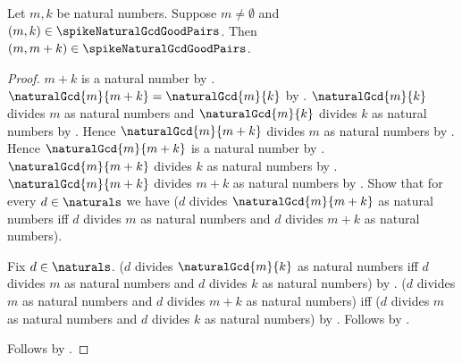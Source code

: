 \begin{theorem}\label{spike15_gcd_good_pair_sum_right}
    Let $m,k$ be natural numbers.
    Suppose $m\neq\emptyset$ and
        $(m,k)\in\spikeNaturalGcdGoodPairs$.
    Then $(m,m+k)\in\spikeNaturalGcdGoodPairs$.
\end{theorem}
\begin{proof}
    $m+k$ is a natural number by .
    $\naturalGcd{m}{m+k}=\naturalGcd{m}{k}$
        by .
    $\naturalGcd{m}{k}$ divides $m$ as natural numbers and
        $\naturalGcd{m}{k}$ divides $k$ as natural numbers
        by .
    Hence $\naturalGcd{m}{m+k}$ divides $m$ as natural numbers
        by \auto.
    Hence $\naturalGcd{m}{m+k}$ is a natural number
        by .
    $\naturalGcd{m}{m+k}$ divides $k$ as natural numbers
        by \auto.
    $\naturalGcd{m}{m+k}$ divides $m+k$ as natural numbers
        by .
    Show that for every $d\in\naturals$ we have
        ($d$ divides $\naturalGcd{m}{m+k}$ as natural numbers iff
         $d$ divides $m$ as natural numbers and
         $d$ divides $m+k$ as natural numbers).
    \begin{subproof}
        Fix $d\in\naturals$.
        ($d$ divides $\naturalGcd{m}{k}$ as natural numbers iff
         $d$ divides $m$ as natural numbers and
         $d$ divides $k$ as natural numbers)
            by .
        ($d$ divides $m$ as natural numbers and
         $d$ divides $m+k$ as natural numbers)
            iff
        ($d$ divides $m$ as natural numbers and
         $d$ divides $k$ as natural numbers)
            by .
        Follows by \auto.
    \end{subproof}
    Follows by .
\end{proof}

